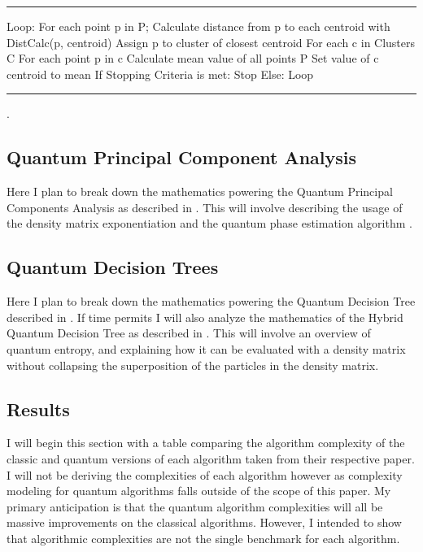 \documentclass[conference]{IEEEtran}
\begin{document}
\noindent\rule{\columnwidth}{1pt}
Loop: \newline
\indent For each point p in P; \newline
\indent \indent Calculate distance from p to each centroid with \newline 
\indent \indent DistCalc(p, centroid) \newline
\indent \indent Assign p to cluster of closest centroid \newline
\indent For each c in Clusters C \newline
\indent \indent For each point p in  c \newline
\indent \indent \indent Calculate mean value of all points P \newline
\indent \indent \indent Set value of c centroid to mean \newline
\indent If Stopping Criteria is met: \newline
\indent \indent Stop \newline
\indent Else: \newline
\indent\indent Loop \newline
\noindent\rule{\columnwidth}{1pt}
\cite{b6}.
\subsection{Quantum Principal Component Analysis}
Here I plan to break down the mathematics powering the Quantum Principal Components Analysis as described in \cite{b7}. This will involve describing the usage of the density matrix exponentiation and the quantum phase estimation algorithm \cite{b7}.
\subsection{Quantum Decision Trees}
Here I plan to break down the mathematics powering the Quantum Decision Tree described in \cite{b13}. If time permits I will also analyze the mathematics of the Hybrid Quantum Decision Tree as described in \cite{b14}. This will involve an overview of quantum entropy, and explaining how it can be evaluated with a density matrix without collapsing the superposition of the particles in the density matrix. 


\subsection{Results}
I will begin this section with a table comparing the algorithm complexity of the classic and quantum versions of each algorithm taken from their respective paper. I will not be deriving the complexities of each algorithm however as complexity modeling for quantum algorithms falls outside of the scope of this paper. My primary anticipation is that  the quantum algorithm complexities will all be massive improvements on the classical algorithms. However, I intended to show that algorithmic complexities are not the single benchmark for each algorithm. 
\end{document}
